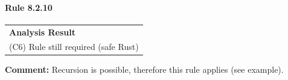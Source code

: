 \paragraph{Rule 8.2.10}
\begin{longtable}{p{13cm}}
\textbf{Analysis Result} \\
(C6) Rule still required (safe Rust) \\
\end{longtable}
\textbf{Comment:} Recursion is possible, therefore this rule applies (see example). \\


